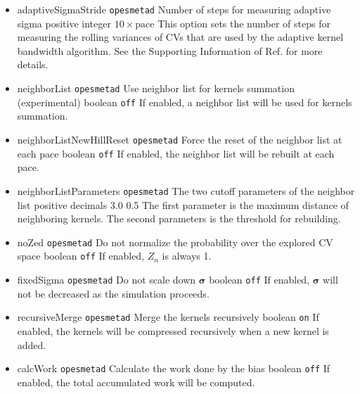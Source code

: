 \begin{itemize}
\item %
  \keydef
    {adaptiveSigmaStride}{%
    \texttt{opes{\textunderscore}metad}}{%
    Number of steps for measuring adaptive sigma}{%
    positive integer}{%
    $10\times\mathrm{pace}$}{%
    This option sets the number of steps for measuring the rolling variances of CVs that are used by the adaptive kernel bandwidth algorithm. See the Supporting Information of Ref.\cite{Invernizzi2022} for more details.}
\item %
  \keydef
    {neighborList}{%
    \texttt{opes{\textunderscore}metad}}{%
    Use neighbor list for kernels summation (experimental)}{%
    boolean}{%
    \texttt{off}}{%
    If enabled, a neighbor list will be used for kernels summation.}
\item %
  \keydef
    {neighborListNewHillReset}{%
    \texttt{opes{\textunderscore}metad}}{%
    Force the reset of the neighbor list at each pace}{%
    boolean}{%
    \texttt{off}}{%
    If enabled, the neighbor list will be rebuilt at each pace.}
\item %
  \keydef
    {neighborListParameters}{%
    \texttt{opes{\textunderscore}metad}}{%
    The two cutoff parameters of the neighbor list}{%
    positive decimals}{%
    3.0 0.5}{%
    The first parameter is the maximum distance of neighboring kernels. The second parameters is the threshold for rebuilding.}
\item %
  \keydef
    {noZed}{%
    \texttt{opes{\textunderscore}metad}}{%
    Do not normalize the probability over the explored CV space}{%
    boolean}{%
    \texttt{off}}{%
    If enabled, $Z_n$ is always 1.}
\item %
  \keydef
    {fixedSigma}{%
    \texttt{opes{\textunderscore}metad}}{%
    Do not scale down $\boldsymbol{\sigma}$}{%
    boolean}{%
    \texttt{off}}{%
    If enabled, $\boldsymbol{\sigma}$ will not be decreased as the simulation proceeds.}
\item %
  \keydef
    {recursiveMerge}{%
    \texttt{opes{\textunderscore}metad}}{%
    Merge the kernels recursively}{%
    boolean}{%
    \texttt{on}}{%
    If enabled, the kernels will be compressed recursively when a new kernel is added.}
\item %
  \keydef
    {calcWork}{%
    \texttt{opes{\textunderscore}metad}}{%
    Calculate the work done by the bias}{%
    boolean}{%
    \texttt{off}}{%
    If enabled, the total accumulated work will be computed.}
\end{itemize}

